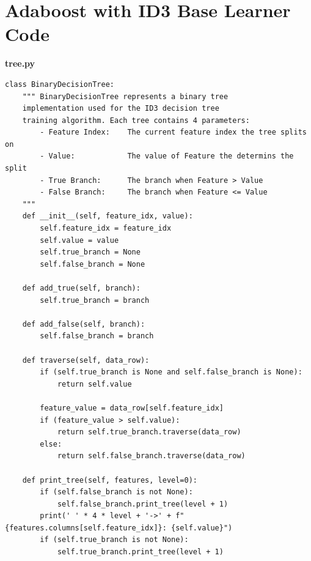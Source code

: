 \documentclass[a4paper]{article}
\begin{document}
\newpage
\renewcommand{\thesection}{Appendix \Alph{section}: \hspace{-4mm}}
\setcounter{section}{0} %

\newpage
\section{Adaboost with ID3 Base Learner Code}
\label{section:adaboost-code}
\textbf{tree.py}
\begin{lstlisting}[basicstyle= \scriptsize]
class BinaryDecisionTree:
    """ BinaryDecisionTree represents a binary tree
    implementation used for the ID3 decision tree
    training algorithm. Each tree contains 4 parameters:
        - Feature Index:    The current feature index the tree splits on
        - Value:            The value of Feature the determins the split
        - True Branch:      The branch when Feature > Value
        - False Branch:     The branch when Feature <= Value
    """
    def __init__(self, feature_idx, value):
        self.feature_idx = feature_idx
        self.value = value
        self.true_branch = None
        self.false_branch = None

    def add_true(self, branch):
        self.true_branch = branch

    def add_false(self, branch):
        self.false_branch = branch

    def traverse(self, data_row):
        if (self.true_branch is None and self.false_branch is None):
            return self.value

        feature_value = data_row[self.feature_idx]
        if (feature_value > self.value):
            return self.true_branch.traverse(data_row)
        else:
            return self.false_branch.traverse(data_row)

    def print_tree(self, features, level=0):
        if (self.false_branch is not None):
            self.false_branch.print_tree(level + 1)
        print(' ' * 4 * level + '->' + f"{features.columns[self.feature_idx]}: {self.value}")
        if (self.true_branch is not None):
            self.true_branch.print_tree(level + 1)
\end{lstlisting}
\end{document}
